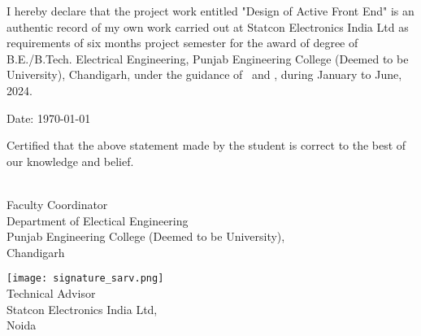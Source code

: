 I hereby declare that the project work entitled "Design of Active Front End" is
an authentic record of my own work carried out at Statcon Electronics India Ltd
as requirements of six months project semester for the award of degree of
B.E./B.Tech. Electrical Engineering, Punjab Engineering College (Deemed to be
University), Chandigarh, under the guidance of \industry\ and \faculty, during
January to June, 2024.

\vspace*{2.5cm}
\noindent
\begin{minipage}[t]{0.5\textwidth}
    \raggedright
    {Date: {\today}}
\end{minipage}
\hfill
\begin{minipage}[t]{0.5\textwidth}

\end{minipage}
\vfill

\noindent
Certified that the above statement made by the student is correct to the best of our knowledge and belief.

\vspace*{2cm}

\noindent
\begin{minipage}[t]{0.5\textwidth}
    \raggedright
    \faculty \\
    Faculty Coordinator\\
    Department of Electical Engineering\\
    Punjab Engineering College (Deemed to be University),\\
    Chandigarh
\end{minipage}
\hfill
\begin{minipage}[t]{0.5\textwidth}
    \raggedleft
    \texttt{[image: signature\_sarv.png]}
    \industry \\
    Technical Advisor\\
    Statcon Electronics India Ltd,\\
    Noida

\end{minipage}